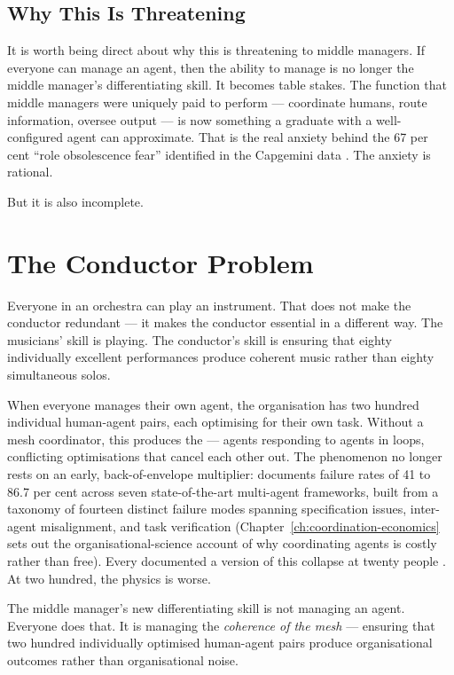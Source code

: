 \subsection{Why This Is Threatening}

It is worth being direct about why this is threatening to middle managers. If everyone can manage an agent, then the ability to manage is no longer the middle manager's differentiating skill. It becomes table stakes. The function that middle managers were uniquely paid to perform --- coordinate humans, route information, oversee output --- is now something a graduate with a well-configured agent can approximate. That is the real anxiety behind the 67 per cent ``role obsolescence fear'' identified in the Capgemini data \parencite{Capgemini2025}. The anxiety is rational.

But it is also incomplete.

\section{The Conductor Problem}

Everyone in an orchestra can play an instrument. That does not make the conductor redundant --- it makes the conductor essential in a different way. The musicians' skill is playing. The conductor's skill is ensuring that eighty individually excellent performances produce coherent music rather than eighty simultaneous solos.

When everyone manages their own agent, the organisation has two hundred individual human-agent pairs, each optimising for their own task. Without a mesh coordinator, this produces the  --- agents responding to agents in loops, conflicting optimisations that cancel each other out. The phenomenon no longer rests on an early, back-of-envelope multiplier: \textcite{Cemri2025} documents failure rates of 41 to 86.7 per cent across seven state-of-the-art multi-agent frameworks, built from a taxonomy of fourteen distinct failure modes spanning specification issues, inter-agent misalignment, and task verification (Chapter~\ref{ch:coordination-economics} sets out the organisational-science account of why coordinating agents is costly rather than free). Every documented a version of this collapse at twenty people \parencite{Shipper2026}. At two hundred, the physics is worse.

The middle manager's new differentiating skill is not managing an agent. Everyone does that. It is managing the \emph{coherence of the mesh} --- ensuring that two hundred individually optimised human-agent pairs produce organisational outcomes rather than organisational noise.

